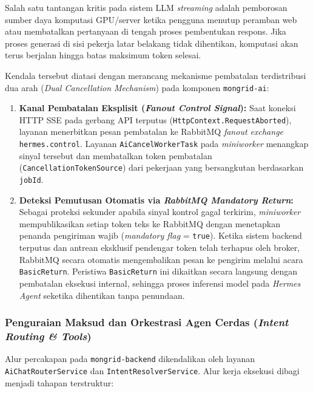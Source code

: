 Salah satu tantangan kritis pada sistem LLM \textit{streaming} adalah pemborosan sumber daya komputasi GPU/server ketika pengguna menutup peramban web atau membatalkan pertanyaan di tengah proses pembentukan respons. Jika proses generasi di sisi pekerja latar belakang tidak dihentikan, komputasi akan terus berjalan hingga batas maksimum token selesai.

Kendala tersebut diatasi dengan merancang mekanisme pembatalan terdistribusi dua arah (\textit{Dual Cancellation Mechanism}) pada komponen \texttt{mongrid-ai}:
\begin{enumerate}[label=\arabic*., leftmargin=*, itemsep=0pt]
  \item \textbf{Kanal Pembatalan Eksplisit (\textit{Fanout Control Signal}):} Saat koneksi HTTP SSE pada gerbang API terputus (\texttt{HttpContext.RequestAborted}), layanan menerbitkan pesan pembatalan ke RabbitMQ \textit{fanout exchange} \texttt{hermes.control}. Layanan \texttt{AiCancelWorkerTask} pada \textit{miniworker} menangkap sinyal tersebut dan membatalkan token pembatalan (\texttt{CancellationTokenSource}) dari pekerjaan yang bersangkutan berdasarkan \texttt{jobId}.
  \item \textbf{Deteksi Pemutusan Otomatis via \textit{RabbitMQ Mandatory Return}:} Sebagai proteksi sekunder apabila sinyal kontrol gagal terkirim, \textit{miniworker} mempublikasikan setiap token teks ke RabbitMQ dengan menetapkan penanda pengiriman wajib (\textit{mandatory flag} = \texttt{true}). Ketika sistem backend terputus dan antrean eksklusif pendengar token telah terhapus oleh broker, RabbitMQ secara otomatis mengembalikan pesan ke pengirim melalui acara \texttt{BasicReturn}. Peristiwa \texttt{BasicReturn} ini dikaitkan secara langsung dengan pembatalan eksekusi internal, sehingga proses inferensi model pada \textit{Hermes Agent} seketika dihentikan tanpa penundaan.
\end{enumerate}

\subsubsection{Penguraian Maksud dan Orkestrasi Agen Cerdas (\textit{Intent Routing \& Tools})}

Alur percakapan pada \texttt{mongrid-backend} dikendalikan oleh layanan \texttt{AiChatRouterService} dan \texttt{IntentResolverService}. Alur kerja eksekusi dibagi menjadi tahapan terstruktur:

